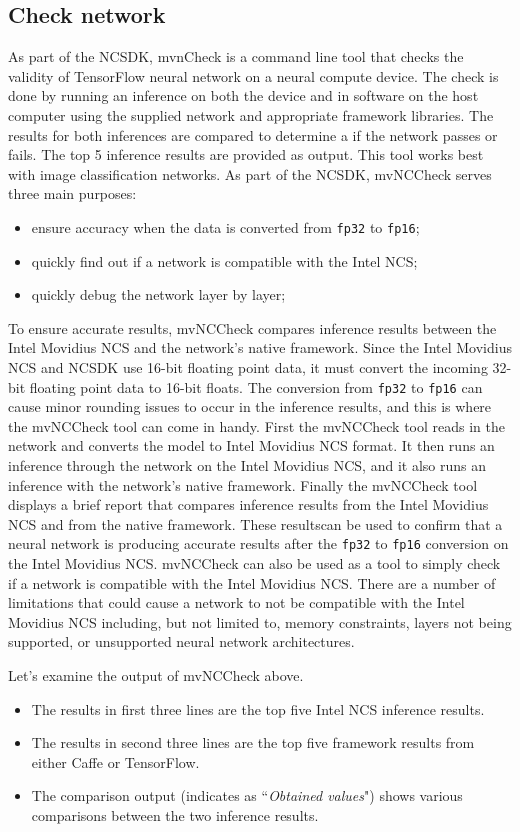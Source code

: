 \subsection{Check network}
\label{subsect:mvnCCheck} 
As part of the NCSDK, mvnCheck is a command line tool that checks the validity 
of TensorFlow neural network on a neural compute device.
The check is done by running an inference on both the device and in software on
the host computer using the supplied network and appropriate framework
libraries.  
The results for both inferences are compared to determine a if the
network  passes or fails. The top 5 inference results are provided as output.
This tool works best with image classification networks. 
As part of the NCSDK, mvNCCheck serves three main purposes:
%
\begin{itemize} 
	\item ensure accuracy when the data is converted from \texttt{fp32} to \texttt{fp16};
	\item quickly find out if a network is compatible with the Intel NCS; 
	\item quickly debug the network layer by layer;
\end{itemize} 
%
To ensure accurate results, mvNCCheck compares inference results between the 
Intel Movidius NCS and the network’s native framework. 
Since the Intel Movidius NCS and NCSDK use 16-bit floating point data, it must 
convert the incoming 32-bit floating point data to 16-bit floats. 
The conversion from \texttt{fp32} to \texttt{fp16} can cause minor rounding issues to
occur in the inference results, and this is where the mvNCCheck tool can come in
handy. 
%
First the mvNCCheck tool reads in the network and converts the model to Intel
Movidius NCS format. It then runs an inference through the network on the Intel
Movidius NCS, and it also runs an inference with the network’s native framework.
%
Finally the mvNCCheck tool displays a brief report that compares inference
results from the Intel Movidius NCS and from the native framework. 
These resultscan be used to confirm that a neural network is producing accurate 
results after the \texttt{fp32} to \texttt{fp16} conversion on the Intel Movidius NCS. 
%
mvNCCheck can also be used as a tool to simply check if a network is compatible
with the Intel Movidius NCS. There are a number of limitations that could cause
a network to not be compatible with the Intel Movidius NCS including, but not
limited to, memory constraints, layers not being supported, or unsupported
neural network architectures.
\begin{mycolorbox}[colback=light-gray]
	{\tiny\texttt{}}
\end{mycolorbox}
%
Let’s examine the output of mvNCCheck above.
\begin{itemize}
\item The results in first three lines are the top five Intel NCS inference results. 
\item The results in second three lines are the top five framework results from 
either Caffe or TensorFlow.
\item The comparison output (indicates as ``\emph{Obtained values}") shows 
various comparisons between the two inference results.
\end{itemize}
%
